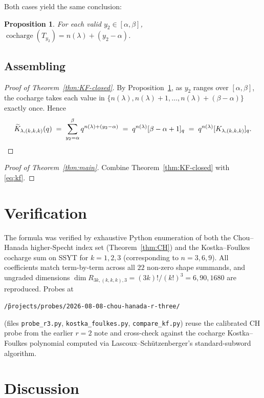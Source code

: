 \documentclass[11pt]{article}
\newtheorem{proposition}[theorem]{Proposition}
\theoremstyle{definition}
\theoremstyle{remark}
\DeclareMathOperator{\cocharge}{cocharge}
\begin{document}
\medskip

Both cases yield the same conclusion:

\begin{proposition}\label{prop:cc-formula}
For each valid $y_2 \in [\alpha, \beta]$,
$\cocharge(T_{y_2}) = n(\lambda) + (y_2 - \alpha)$.
\end{proposition}

\subsection*{Assembling}

\begin{proof}[Proof of Theorem~\ref{thm:KF-closed}]
By Proposition~\ref{prop:cc-formula}, as $y_2$ ranges over
$[\alpha,\beta]$, the cocharge takes each value in $\{n(\lambda),
n(\lambda)+1, \ldots, n(\lambda) + (\beta - \alpha)\}$ exactly once. Hence
\[
    \widetilde K_{\lambda,(k,k,k)}(q)
    \;=\;
    \sum_{y_2=\alpha}^{\beta} q^{n(\lambda) + (y_2 - \alpha)}
    \;=\;
    q^{n(\lambda)}[\beta - \alpha + 1]_q
    \;=\;
    q^{n(\lambda)}[K_{\lambda,(k,k,k)}]_q.\qedhere
\]
\end{proof}

\begin{proof}[Proof of Theorem~\ref{thm:main}]
Combine Theorem~\ref{thm:KF-closed} with \eqref{eq:kf}.
\end{proof}

\section{Verification}

The formula was verified by exhaustive Python enumeration of both the
Chou--Hanada higher-Specht index set (Theorem~\ref{thm:CH}) and the
Kostka--Foulkes cocharge sum on SSYT for $k = 1, 2, 3$
(corresponding to $n = 3, 6, 9$). All coefficients match term-by-term across
all $22$ non-zero shape summands, and ungraded dimensions
$\dim R_{3k,(k,k,k),3} = (3k)!/(k!)^3 = 6, 90, 1680$ are reproduced.
Probes at
\begin{center}
\texttt{\~/projects/probes/2026-08-08-chou-hanada-r-three/}
\end{center}
(files \texttt{probe\_r3.py}, \texttt{kostka\_foulkes.py},
\texttt{compare\_kf.py}) reuse the calibrated CH probe from the earlier
$r=2$ note and cross-check against the cocharge Kostka--Foulkes polynomial
computed via Lascoux--Sch\"utzenberger's standard-subword algorithm.

\section{Discussion}
\end{document}
